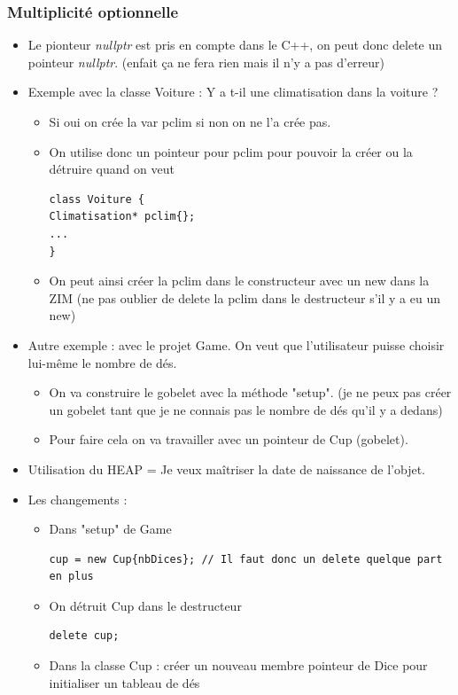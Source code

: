 \documentclass[12pt,a4paper]{article}
\begin{document}
\subsubsection{Multiplicité optionnelle}
\begin{itemize}
\item Le pionteur \textit{nullptr} est pris en compte dans le C++, on peut donc delete un pointeur \textit{nullptr}. (enfait ça ne fera rien mais il n'y a pas d'erreur)
\item Exemple avec la classe Voiture : Y a t-il une climatisation dans la voiture ?
\begin{itemize}
\item Si oui on crée la var pclim si non on ne l'a crée pas.
\item On utilise donc un pointeur pour pclim pour pouvoir la créer ou la détruire quand on veut
\begin{lstlisting}
class Voiture {
Climatisation* pclim{};
...
}
\end{lstlisting}
\item On peut ainsi créer la pclim dans le constructeur avec un new dans la ZIM (ne pas oublier de delete la pclim dans le destructeur s'il y a eu un new)
\end{itemize}
\item Autre exemple : avec le projet Game. On veut que l'utilisateur puisse choisir lui-même le nombre de dés.
\begin{itemize}
\item On va construire le gobelet avec la méthode "setup". (je ne peux pas créer un gobelet tant que je ne connais pas le nombre de dés qu'il y a dedans)
\item Pour faire cela on va travailler avec un pointeur de Cup (gobelet).
\end{itemize}
\item Utilisation du HEAP = Je veux maîtriser la date de naissance de l'objet.
\item Les changements :
\begin{itemize}
\item Dans "setup" de Game
\begin{lstlisting}
cup = new Cup{nbDices}; // Il faut donc un delete quelque part en plus
\end{lstlisting}
\item On détruit Cup dans le destructeur
\begin{lstlisting}
delete cup;
\end{lstlisting}
\item Dans la classe Cup : créer un nouveau membre pointeur de Dice pour initialiser un tableau de dés

\end{itemize}
\end{itemize}
\end{document}
